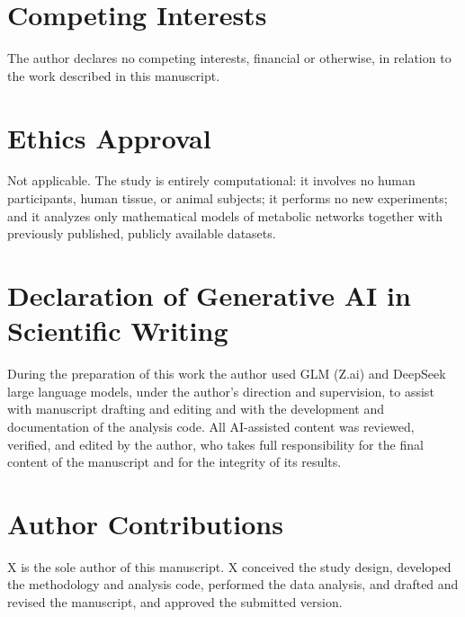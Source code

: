\documentclass[11pt,a4paper]{article}
\theoremstyle{plain}
\theoremstyle{definition}
\theoremstyle{remark}
\begin{document}
\section*{Competing Interests}
The author declares no competing interests, financial or otherwise,
in relation to the work described in this manuscript.

\section*{Ethics Approval}
Not applicable. The study is entirely computational: it involves no
human participants, human tissue, or animal subjects; it performs no
new experiments; and it analyzes only mathematical models of
metabolic networks together with previously published, publicly
available datasets.

\section*{Declaration of Generative AI in Scientific Writing}
During the preparation of this work the author used GLM (Z.ai) and
DeepSeek large language models, under the author's direction and
supervision, to assist with manuscript drafting and editing and with
the development and documentation of the analysis code. All
AI-assisted content was reviewed, verified, and edited by the
author, who takes full responsibility for the final content of the
manuscript and for the integrity of its results.

\section*{Author Contributions}
X is the sole author of this manuscript. X conceived the study
design, developed the methodology and analysis code, performed the
data analysis, and drafted and revised the manuscript, and approved
the submitted version.


\end{document}
